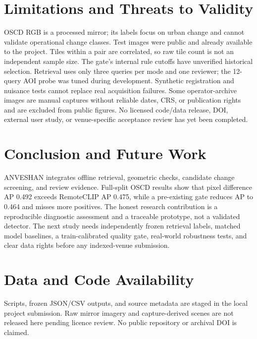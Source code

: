 \documentclass[conference,a4paper]{IEEEtran}
\begin{document}
\section{Limitations and Threats to Validity}
OSCD RGB is a processed mirror; its labels focus on urban change and cannot validate operational change classes. Test images were public and already available to the project. Tiles within a pair are correlated, so raw tile count is not an independent sample size. The gate's internal rule cutoffs have unverified historical selection. Retrieval uses only three queries per mode and one reviewer; the 12-query AOI probe was tuned during development. Synthetic registration and nuisance tests cannot replace real acquisition failures. Some operator-archive images are manual captures without reliable dates, CRS, or publication rights and are excluded from public figures. No licensed code/data release, DOI, external user study, or venue-specific acceptance review has yet been completed.

\section{Conclusion and Future Work}
ANVESHAN integrates offline retrieval, geometric checks, candidate change screening, and review evidence. Full-split OSCD results show that pixel difference AP 0.492 exceeds RemoteCLIP AP 0.475, while a pre-existing gate reduces AP to 0.464 and misses more positives. The honest research contribution is a reproducible diagnostic assessment and a traceable prototype, not a validated detector. The next study needs independently frozen retrieval labels, matched model baselines, a train-calibrated quality gate, real-world robustness tests, and clear data rights before any indexed-venue submission.

\section*{Data and Code Availability}
Scripts, frozen JSON/CSV outputs, and source metadata are staged in the local project submission. Raw mirror imagery and capture-derived scenes are not released here pending licence review. No public repository or archival DOI is claimed.
\end{document}
